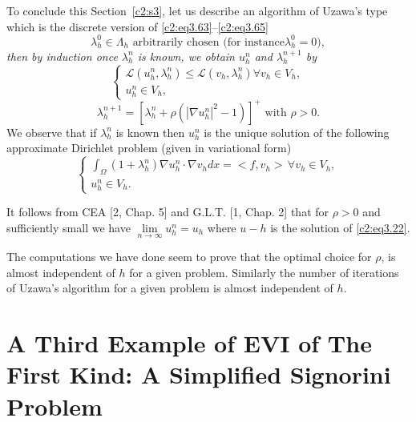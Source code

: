To conclude this Section~\ref{c2:s3}, let us describe an algorithm of
Uzawa's type which is the discrete version of 
\eqref{c2:eq3.63}--\eqref{c2:eq3.65}  
\begin{equation}
\lambda^0_h \in \Lambda_h \text{ arbitrarily chosen (for instance
}  \lambda^0_h =0), \tag{3.69}\label{c2:eq3.69} 
\end{equation}
\textit{then by induction once $\lambda^n_h$  is known, we obtain
  $u^n_h$ and $\lambda^{n+1}_h$ by}  
\begin{equation}
\begin{cases}
\mathscr{L} (u^n_h, \lambda^n_h) \leq \mathscr{L} (v_h, \lambda^n_h)
\forall v_h \in V_h,\\ 
u^n_h \in V_h, \tag{3.70}\label{c2:eq3.70}
\end{cases}
\end{equation}
\begin{equation}
\lambda^{n+1}_h = [\lambda^n_h + \rho (|\nabla u^n_h |^2  -1)
]^+ \text{ with } \rho > 0 . \tag{3.71}\label{c2:eq3.71} 
\end{equation}
We observe that if $\lambda^n_h$ is known then $u^n_h$ is the unique
solution of the following approximate Dirichlet problem (given  in
variational form) 
\begin{equation}
\begin{cases}
\int_\Omega (1+ \lambda^n_h) \nabla u^n_h \cdot \nabla
v_h dx = <f,  v_h>\, \forall  v_h \in V_h, \\ 
 u^n_h \in V_h. \tag{3.72}\label{c2:eq3.72} 
\end{cases}
\end{equation}

It follows from CEA [2, Chap. 5] and G.L.T. [1, Chap. 2] that for
$\rho > 0$ and sufficiently small we have $\lim\limits_{n \to \infty
}u^n_h = u_h$ where $u-h$ is the solution of \eqref{c2:eq3.22}. 

\begin{remark}\label{c2:rem3.12}%
The computations we have done seem to prove that the optimal choice
for $\rho$, is almost independent of $h$ for a given
problem. Similarly the number of iterations of Uzawa's algorithm for a
given problem is almost independent of $h$.  
\end{remark}

\section[A Third Example of EVI of The...]{A Third Example of EVI of
  The First Kind: A Simplified Signorini Problem}\label{c2:s4} 

